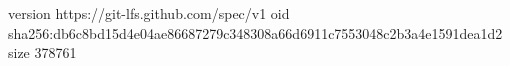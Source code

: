 version https://git-lfs.github.com/spec/v1
oid sha256:db6c8bd15d4e04ae86687279c348308a66d6911c7553048c2b3a4e1591dea1d2
size 378761
